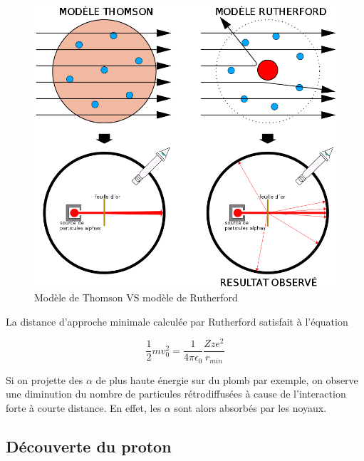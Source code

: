\begin{figure}[ht]
    \centering
    \includegraphics[scale=0.25]{Images1/thom_ruth.png}
    \caption{Modèle de Thomson VS modèle de Rutherford}
    \label{fig:mod_rutherford}
\end{figure}

La distance d'approche minimale calculée par Rutherford satisfait à l'équation

$$\dfrac{1}{2}mv_0^2=\dfrac{1}{4\pi\epsilon_0}\dfrac{Zze^2}{r_{min}}$$

Si on projette des $\alpha$ de plus haute énergie sur du plomb par exemple, on observe une diminution du nombre de particules rétrodiffusées à cause de l'interaction forte à courte distance. En effet, les $\alpha$ sont alors absorbés par les noyaux.

\subsection{Découverte du proton}

